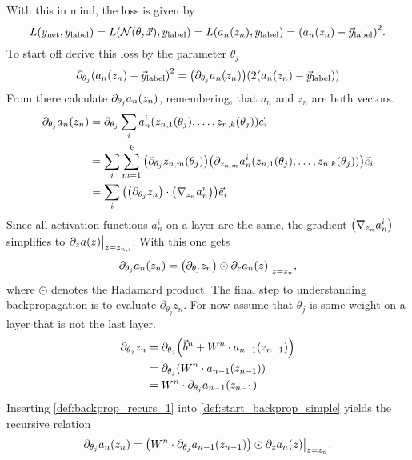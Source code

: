 With this in mind, the loss is given by
\begin{equation}
L{\left( y_\text{net}, y_\text{label} \right)}=L{\left( \mathcal{N}{\left( \theta,\vec{x} \right)}, y_\text{label} \right)}=L{\left( a_n{\left( z_n \right)}, y_\text{label} \right)}={\left( a_n{\left( z_n \right)}- \vec{y}_\text{label} \right)}^2.
\end{equation}
To start off derive this loss by the parameter $\theta_j$
\begin{equation}
\partial_{\theta_j}{\left( a_n{\left( z_n \right)}- \vec{y}_\text{label} \right)}^2={\left( \partial_{\theta_j}a_n{\left( z_n \right)} \right)}{\left( 2{\left( a_n{\left( z_n \right)}- \vec{y}_\text{label} \right)} \right)}
\end{equation}
From there calculate $\partial_{\theta_j}a_n{\left( z_n \right)}$, remembering, that $a_n$ and $z_n$ are both vectors.
\begin{align}\label{def:start_backprop}
\partial_{\theta_j}a_n{\left( z_n \right)} & = \partial_{\theta_j}\sum_i a_n^i{\left( z_{n,1}{\left( \theta_j \right)},\dotsc, z_{n,k}{\left( \theta_j \right)} \right)} \vec{e}_i\nonumber\\
& = \sum_i \sum_{m=1}^k {\left( \partial_{\theta_j}z_{n, m}{\left( \theta_j \right)} \right)}{\left( \partial_{z_{n, m}} a_n^i{\left( z_{n,1}{\left( \theta_j \right)},\dotsc, z_{n,k}{\left( \theta_j \right)} \right)} \right)} \vec{e}_i\nonumber\\
& = \sum_i {\left( {\left( \partial_{\theta_j}z_n \right)}\cdot {\left( \nabla_{z_n} a_n^i \right)} \right)}\vec{e}_i
\end{align}
Since all activation functions $a_n^i$ on a layer are the same, the gradient ${\left( \nabla_{z_n} a_n^i \right)}$ simplifies to $\partial_z \restr{a(z)}{z=z_{n,i}}$. With this one gets
\begin{equation}\label{def:start_backprop_simple}
\partial_{\theta_j}a_n\lr{z_n} = \lr{\partial_{\theta_j} z_n} \odot \partial_z \restr{a_n(z)}{z=z_n},
\end{equation}
where $\odot$ denotes the Hadamard product.
The final step to understanding backpropagation is to evaluate $\partial_{\theta_j}z_n$. For now assume that $\theta_j$ is some weight on a layer that is not the last layer.
\begin{align}\label{def:backprop_recurs_1}
\partial_{\theta_j}z_n & = \partial_{\theta_j}{\left( \vec{b}^n+W^n\cdot a_{n-1}{\left( z_{n-1} \right)} \right)}\nonumber\\
& = \partial_{\theta_j}{\left( W^n\cdot a_{n-1}{\left( z_{n-1} \right)} \right)}\nonumber\\
& = W^n\cdot\partial_{\theta_j}a_{n-1}{\left( z_{n-1} \right)}
\end{align}
Inserting \eqref{def:backprop_recurs_1} into \eqref{def:start_backprop_simple} yields the recursive relation
\begin{equation}\label{def:backprop_recursive_relation}
\partial_{\theta_j}a_n\lr{z_n} = \lr{W^n\cdot\partial_{\theta_j}a_{n-1}\lr{z_{n-1}}}\odot\partial_z \restr{a_n(z)}{z=z_n}.
\end{equation}
